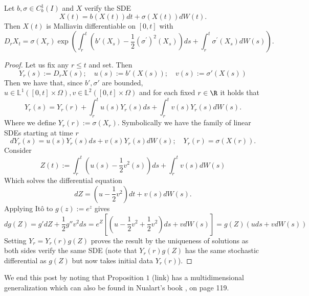 \documentclass[
    a4paper,
    DIV=14,
    abstract=true,
    numbers=noenddot
]{scrartcl}
\begin{document}
\begin{theorem}
	Let $b,\sigma \in C^1_b(I)$ and $X$ verify  the SDE
	\begin{equation*}
		X(t)=b(X(t))d t +\sigma(X(t)) dW(t).
	\end{equation*}
	Then $X(t)$ is Malliavin differentiable on $[0,t]$ with
	\begin{equation*}
		D_r X_t=\sigma\left(X_r\right) \exp \left(\int_r^t\left(b'\left(X_s\right)-\frac{1}{2}\left(\sigma^{\prime}\right)^2\left(X_s\right)\right) d s+\int_r^t \sigma^{\prime}\left(X_s\right) d W(s)\right).
	\end{equation*}
	\begin{proof}
		Let us fix any $r\leq t$ and set. Then
		\begin{equation*}
			Y_r(s):=D_rX(s);\quad  u(s):=b'(X(s));\quad v(s):=\sigma'(X(s))
		\end{equation*}
		Then we have that, since $b',\sigma '$ are bounded, $u\in \mathbb{L}^1([0,t]\times\Omega),v\in \mathbb{L}^2([0,t]\times\Omega)$ and for each fixed $r\in  \R$ it holds that
		\begin{equation*}
			Y_r(s)=Y_r(r)+\int_{r}^t u(s)Y_r(s) ds+\int_{r}^t v(s)Y_r(s)  dW(s) .
		\end{equation*}
		Where we define $Y_r(r):=\sigma (X_r)$. Symbolically we have the family of linear SDEs starting at time $r$
		\begin{equation*}
			dY_r(s)=u(s)Y_r(s) ds+v(s)Y_r(s)  dW(s);\quad Y_r(r)=\sigma(X(r)).
		\end{equation*}
		Consider
		\begin{equation*}
			Z(t) := \int_r^t\left(u(s)-\frac{1}{2}v^2(s)\right) d s + \int_r^t v(s) d W(s)
		\end{equation*}
		Which solves the differential equation
		\begin{equation*}
			dZ=\left(u-\frac{1}{2}v^2\right)d t+v(s)dW(s) .
		\end{equation*}
		Applying Itô to  $g(z):=e^z$ gives
		\begin{equation*}
dg(Z) = g'dZ + \frac{1}{2}g''v^2 ds = e^Z\left[\left(u-\frac{1}{2}v^2+\frac{1}{2}v^2\right)ds + v dW(s)\right] = g(Z)(u ds + v dW(s))
		\end{equation*}
		Setting $Y_r=Y_r(r)g(Z)$ proves the result by the uniqueness of solutions as both sides verify the same SDE (note that  $Y_r(r)g(Z)$ has the same stochastic differential as $g(Z)$ but now takes initial data  $Y_r(r)$).
	\end{proof}
\end{theorem}
We end this post by noting that  Proposition $1$ (link) has a multidimensional generalization which can also be found in Nualart's book \cite{nualart2018introduction}, on page 119.


\end{document}
